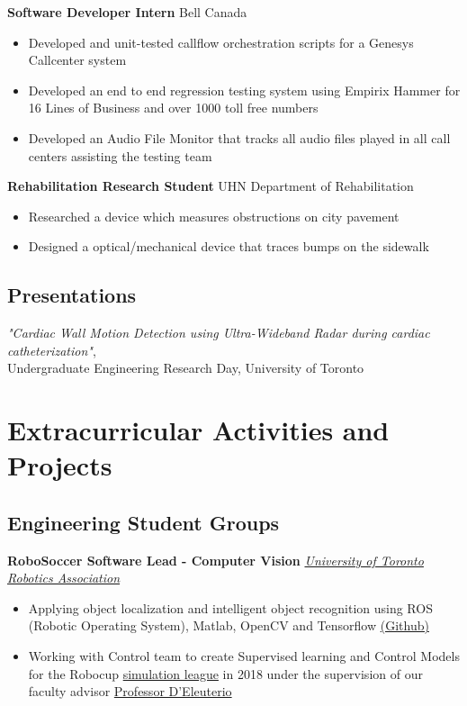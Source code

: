 \documentclass[10pt, a4paper]{cv}
\begin{document}
	\textbf{Software Developer Intern} \hfill Bell Canada
	\begin{itemize}
		\item Developed and unit-tested callflow orchestration scripts for a Genesys Callcenter system
		\item Developed an end to end regression testing system using Empirix Hammer for 16 Lines of Business and over 1000 toll free numbers
		\item Developed an Audio File Monitor that tracks all audio files played in all call centers assisting the testing team
	\end{itemize}
	
	\textbf{Rehabilitation Research Student} \hfill UHN Department of Rehabilitation
	\begin{itemize}
		\item Researched a device which measures obstructions on city pavement
		\item Designed a optical/mechanical device that traces bumps on the sidewalk
	\end{itemize}

\subsection*{Presentations}\noindent
{}\textit{"Cardiac Wall Motion Detection using Ultra-Wideband Radar during cardiac catheterization"}, \\Undergraduate Engineering Research Day, University of Toronto

\section*{Extracurricular Activities and Projects}

\subsection*{Engineering Student Groups}\noindent

	\textbf{RoboSoccer Software Lead - Computer Vision} \hfill \emph{\href{http://www.utra.ca}{University of Toronto Robotics Association}}
	\begin{itemize}
		\item Applying object localization and intelligent object recognition using ROS (Robotic Operating System), Matlab, OpenCV and Tensorflow \href{https://github.com/utra-robosoccer/soccerbot}{(Github)}
		\item Working with Control team to create Supervised learning and Control Models for the Robocup \href{http://wiki.robocup.org/Soccer_Simulation_League}{simulation league} in 2018 under the supervision of our faculty advisor \href{http://www.utias.utoronto.ca/research/space-robotics/}{Professor D’Eleuterio}
	\end{itemize}
	
\end{document}
